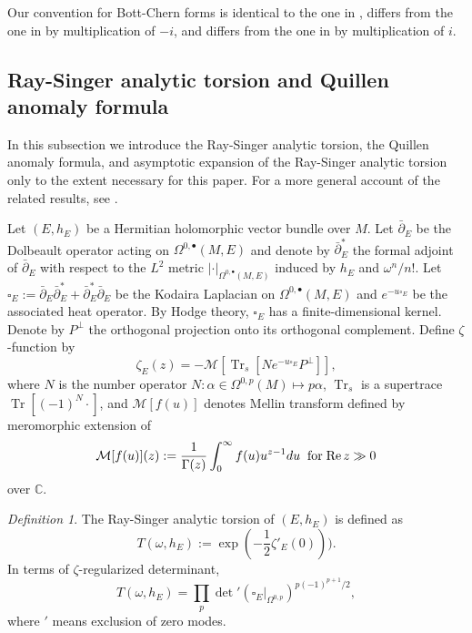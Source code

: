 \documentclass[12pt,reqno,a4paper]{amsart}
\numberwithin{equation}{section}
\def\bp{\bar\partial}
\def\a{\alpha}
\DeclareMathOperator{\Tr}{Tr}
\def\re{{\rm Re\,}}
\theoremstyle{remark}
\theoremstyle{dotless}
\newtheorem{definition}[theo]{{\sc Definition}}
\begin{document}
Our convention for Bott-Chern forms is identical to the one in \cite{BC,tian1999bott}, differs from the one in \cite{bismut1988analytic} by multiplication of $-i$, and differs from the one in \cite{donaldson1985anti,weinkove2002higher} by multiplication of $i$.


\subsection{Ray-Singer analytic torsion and Quillen anomaly formula}\label{subsec}
In this subsection we introduce the Ray-Singer analytic torsion, the Quillen anomaly formula, and asymptotic expansion of the Ray-Singer analytic torsion only to the extent necessary for this paper. For a more general account of the related results, see \cite{bismut1988analytic,ma2007holomorphic}.

Let $(E,h_E)$ be a Hermitian holomorphic vector bundle over $M$. Let $\bp_E$ be the Dolbeault operator acting on $\Omega^{0,\bullet}(M,E)$ and denote by $\bp^{*}_E$ the formal adjoint of $\bp_E$ with respect to the $L^2$ metric $|\cdot|_{\Omega^{0,\bullet}(M,E)}$ induced by $h_E$ and $\omega^n/n!$. Let $\square_E:=\bp_E\bp^{*}_E+\bp^*_E\bp_E$ be the Kodaira Laplacian on $\Omega^{0,\bullet}(M,E)$ and $e^{-u\square_E}$ be the associated heat operator. By Hodge theory, $\square_E$ has a finite-dimensional kernel. Denote by $P^\bot$ the orthogonal projection onto its orthogonal complement. Define $\zeta$-function by
\begin{equation*}
\zeta_E(z)=-\mathcal{M}[\Tr_s[Ne^{-u\square_E}P^\bot]],
\end{equation*}
where $N$ is the number operator $N:\a\in\Omega^{0,p}(M)\mapsto p\a$, $\Tr_s$ is a supertrace $\Tr[(-1)^N\cdot]$, and $\mathcal{M}[f(u)]$ denotes Mellin transform defined by meromorphic extension of
\begin{equation*}
\mathcal{M}[f(u)](z):=\frac{1}{\Gamma(z)}\int_0^\infty f(u)u^{z-1}du\;\;\text{for}\;\re z \gg 0
\end{equation*}
over $\mathbb{C}$.
\begin{definition}
The Ray-Singer analytic torsion of $(E,h_E)$ is defined as
\begin{equation*}
T(\omega,h_E):=\exp{(-\frac12\zeta'_E(0)))}.
\end{equation*}
In terms of $\zeta$-regularized determinant, 
\begin{equation*}
T(\omega,h_E)=\prod_p {\det}'(\square_E|_{\Omega^{0,p}})^{p(-1)^{p+1}/2},
\end{equation*}
where $'$ means exclusion of zero modes.
\end{definition}
\end{document}
